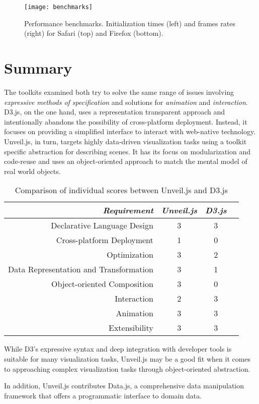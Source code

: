 \begin{figure}
\centering
\texttt{[image: benchmarks]}
\caption{Performance benchmarks. Initialization times (left) and frames rates (right) for Safari (top) and Firefox (bottom).}
\label{fig:benchmarks}
\end{figure}



\section{Summary}

The toolkits examined both try to solve the same range of issues involving \emph{expressive methods of specification} and solutions for \emph{animation} and \emph{interaction}. D3.js, on the one hand, uses a representation transparent approach and intentionally abandons the possibility of cross-platform deployment. Instead, it focuses on providing a simplified interface to interact with web-native technology. Unveil.js, in turn, targets highly data-driven visualization tasks using a toolkit specific abstraction for describing scenes. It has its focus on modularization and code-reuse and uses an object-oriented approach to match the mental model of real world objects. 

\begin{table}
\caption{Comparison of individual scores between Unveil.js and D3.js}
\label{tab:comparison}
\centering
\setlength{\tabcolsep}{5mm} %
\def\arraystretch{1.0} %
\begin{tabular}{|r||c|c|c|} \hline
\emph{Requirement} & \emph{Unveil.js} & \emph{D3.js}\\
\hline\hline
Declarative Language Design & 3 & 3\\
\hline
Cross-platform Deployment & 1 & 0\\
\hline
Optimization & 3 & 2\\
\hline
Data Representation and Transformation & 3 & 1 \\
\hline
Object-oriented Composition & 3 & 0 \\
\hline
Interaction & 2 & 3 \\
\hline
Animation & 3 & 3 \\
\hline
Extensibility & 3 & 3 \\
\hline
\end{tabular}
\end{table}


While D3's expressive syntax and deep integration with developer tools is suitable for many visualization tasks, Unveil.js may be a good fit when it comes to approaching complex visualization tasks through object-oriented abstraction.

In addition, Unveil.js contributes Data.js, a comprehensive data manipulation framework that offers a programmatic interface to domain data.